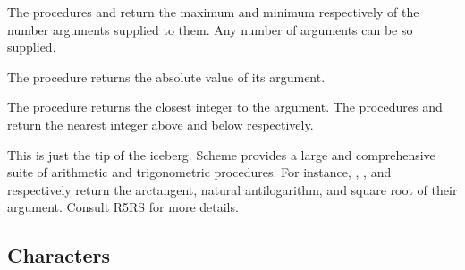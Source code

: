 

\n The procedures  and  return the maximum and
minimum respectively of the number arguments supplied to
them.  Any number of arguments can be so supplied.



\n The procedure  returns the absolute value of
its argument.



\n The procedure  returns the closest integer to the
argument. The procedures  and  return the nearest
integer above and below respectively.



\n This is just the tip of the iceberg.  Scheme
provides a large and comprehensive suite of arithmetic
and trigonometric procedures.  For instance, ,
, and  respectively return the
arctangent, natural antilogarithm, and 
square root of their argument.  Consult
R5RS \cite{r5rs} for more details.


\subsection{Characters}

